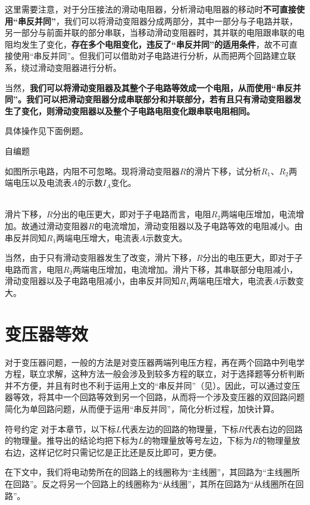 这里需要注意，对于分压接法的滑动电阻器，分析滑动电阻器的移动时\textbf{不可直接使用“串反并同”}，我们可以将滑动变阻器分成两部分，其中一部分与子电路并联，另一部分与前面并联的部分串联，当移动滑动变阻器时，其并联的电阻跟串联的电阻均发生了变化，\textbf{存在多个电阻变化，违反了“串反并同”的适用条件}，故不可直接使用“串反并同”。但我们可以借助对子电路进行分析，从而把两个回路建立联系，绕过滑动变阻器进行分析。

当然，\textbf{我们可以将滑动变阻器及其整个子电路等效成一个电阻，从而使用“串反并同”。我们可以把滑动变阻器分成串联部分和并联部分，若有且只有滑动变阻器发生了变化，则滑动变阻器以及整个子电路电阻变化跟串联电阻相同。}

具体操作见下面例题。

\begin{ep}{自编题}{}

如图所示电路，内阻不可忽略。现将滑动变阻器$R$的滑片下移，试分析$R_1$、$R_2$两端电压以及电流表$A$的示数$I_A$变化。

~\\
滑片下移，$R$分出的电压更大，即对于子电路而言，电阻$R_2$两端电压增加，电流增加。故通过滑动变阻器$R$的电流增加，滑动变阻器以及子电路等效的电阻减小。由串反并同知$R_1$两端电压增大，电流表$A$示数变大。

当然，由于只有滑动变阻器发生了改变，滑片下移，$R$分出的电压更大，即对于子电路而言，电阻$R_2$两端电压增加，电流增加。滑片下移，其串联部分电阻减小，滑动变阻器以及子电路电阻减小，由串反并同知$R_1$两端电压增大，电流表$A$示数变大。

\end{ep}

\section{变压器等效}

对于变压器问题，一般的方法是对变压器两端列电压方程，再在两个回路中列电学方程，联立求解，这种方法一般会涉及到较多方程的联立，对于选择题等分析判断并不方便，并且有时也不利于运用上文的“串反并同”（见）。因此，可以通过变压器等效，将其中一个回路等效到另一个回路，从而将一个涉及变压器的双回路问题简化为单回路问题，从而便于运用“串反并同”，简化分析过程，加快计算。

\begin{mk}{符号约定}{}
对于本章节，以下标$L$代表左边的回路的物理量，下标$R$代表右边的回路的物理量。推导出的结论均把下标为$L$的物理量放等号左边，下标为$R$的物理量放右边，这样记忆时只需记忆是正比还是反比即可，更方便。

在下文中，我们将电动势所在的回路上的线圈称为“主线圈”，其回路为“主线圈所在回路”。反之将另一个回路上的线圈称为“从线圈”，其所在回路为“从线圈所在回路”。
\end{mk}

